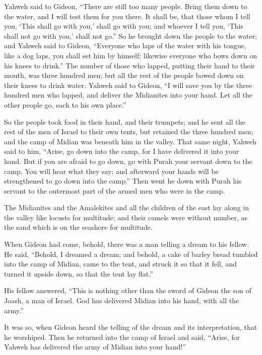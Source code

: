  Yahweh said to Gideon, ``There are still too many people.
Bring them down to the water, and I will test them for you there. It
shall be, that those whom I tell you, `This shall go with you,' shall go
with you; and whoever I tell you, `This shall not go with you,' shall
not go.''  So he brought down the people to the water; and
Yahweh said to Gideon, ``Everyone who laps of the water with his tongue,
like a dog laps, you shall set him by himself; likewise everyone who
bows down on his knees to drink.''  The number of those
who lapped, putting their hand to their mouth, was three hundred men;
but all the rest of the people bowed down on their knees to drink water.
 Yahweh said to Gideon, ``I will save you by the three
hundred men who lapped, and deliver the Midianites into your hand. Let
all the other people go, each to his own place.''

 So the people took food in their hand, and their
trumpets; and he sent all the rest of the men of Israel to their own
tents, but retained the three hundred men; and the camp of Midian was
beneath him in the valley.  That same night, Yahweh said
to him, ``Arise, go down into the camp, for I have delivered it into
your hand.  But if you are afraid to go down, go with
Purah your servant down to the camp.  You will hear what
they say; and afterward your hands will be strengthened to go down into
the camp.'' Then went he down with Purah his servant to the outermost
part of the armed men who were in the camp.

 The Midianites and the Amalekites and all the children
of the east lay along in the valley like locusts for multitude; and
their camels were without number, as the sand which is on the seashore
for multitude.

 When Gideon had come, behold, there was a man telling a
dream to his fellow. He said, ``Behold, I dreamed a dream; and behold, a
cake of barley bread tumbled into the camp of Midian, came to the tent,
and struck it so that it fell, and turned it upside down, so that the
tent lay flat.''

 His fellow answered, ``This is nothing other than the
sword of Gideon the son of Joash, a man of Israel. God has delivered
Midian into his hand, with all the army.''

 It was so, when Gideon heard the telling of the dream
and its interpretation, that he worshiped. Then he returned into the
camp of Israel and said, ``Arise, for Yahweh has delivered the army of
Midian into your hand!''

